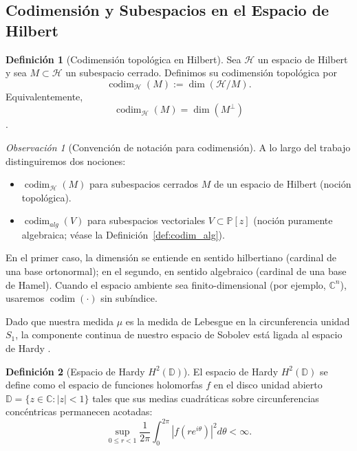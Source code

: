 \documentclass[12pt,a4paper]{article}
\theoremstyle{definition}
\newtheorem{definition}{Definición}
\theoremstyle{remark}
\newtheorem{remark}{Observación}
\newcommand{\C}{\mathbb{C}}
\newcommand{\abs}[1]{\left| #1 \right|}
\begin{document}
\subsection{Codimensión y Subespacios en el Espacio de Hilbert}

\begin{definition}[Codimensión topológica en Hilbert]\label{def:codim_top_hilbert}
	Sea $\mathcal{H}$ un espacio de Hilbert y sea $M\subset \mathcal{H}$ un subespacio cerrado. Definimos su codimensión topológica por
	$$
		\operatorname{codim}_{\mathcal{H}}(M):=\dim(\mathcal{H}/M).
	$$
	Equivalentemente,
	$$
		\operatorname{codim}_{\mathcal{H}}(M)=\dim(M^\perp)
	$$
	\cite{halmos1982hilbert}.
\end{definition}

\begin{remark}[Convención de notación para codimensión]\label{rem:convencion_codim}
	A lo largo del trabajo distinguiremos dos nociones:
	\begin{itemize}
		\item $\operatorname{codim}_{\mathcal{H}}(M)$ para subespacios cerrados $M$ de un espacio de Hilbert (noción topológica).
		\item $\operatorname{codim}_{alg}(V)$ para subespacios vectoriales $V\subset \mathbb{P}[z]$ (noción puramente algebraica; véase la Definición~\ref{def:codim_alg}).
	\end{itemize}
	En el primer caso, la dimensión se entiende en sentido hilbertiano (cardinal de una base ortonormal); en el segundo, en sentido algebraico (cardinal de una base de Hamel).
	Cuando el espacio ambiente sea finito-dimensional (por ejemplo, $\mathbb{C}^n$), usaremos $\operatorname{codim}(\cdot)$ sin subíndice.
\end{remark}

Dado que nuestra medida $\mu$ es la medida de Lebesgue en la circunferencia unidad $S_1$, la componente continua de nuestro espacio de Sobolev está ligada al espacio de Hardy \cite{duren1970theory}.

\begin{definition}[Espacio de Hardy $H^2(\mathbb{D})$]
	El espacio de Hardy $H^2(\mathbb{D})$ se define como el espacio de funciones holomorfas $f$ en el disco unidad abierto $\mathbb{D} = \{z \in \C : \abs{z} < 1\}$ tales que sus medias cuadráticas sobre circunferencias concéntricas permanecen acotadas:
	$$ \sup_{0 \le r < 1} \frac{1}{2\pi} \int_{0}^{2\pi} \abs{f(re^{i\theta})}^2 d\theta < \infty. $$
\end{definition}
\end{document}
